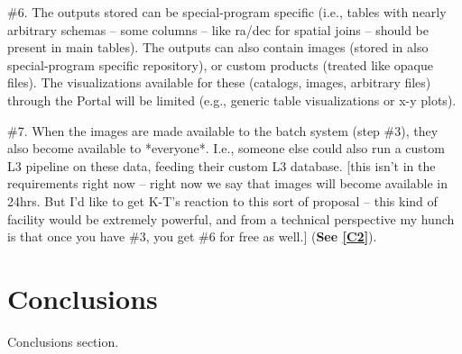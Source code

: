 \documentclass[DM,lsstdraft,toc]{lsstdoc}
\begin{document}
\#6. The outputs stored can be special-program specific (i.e., tables with nearly arbitrary schemas -- some columns -- like ra/dec for spatial joins -- should be present in main tables). The outputs can also contain images (stored in also special-program specific repository), or custom products (treated like opaque files). The visualizations available for these (catalogs, images, arbitrary files) through the Portal will be limited (e.g., generic table visualizations or x-y plots).

\#7. When the images are made available to the batch system (step \#3), they also become available to *everyone*. I.e., someone else could also run a custom L3 pipeline on these data, feeding their custom L3 database. [this isn't in the requirements right now -- right now we say that images will become available in 24hrs. But I'd like to get K-T's reaction to this sort of proposal -- this kind of facility would be extremely powerful, and from a technical perspective my hunch is that once you have \#3, you get \#6 for free as well.]
 (\textbf{See \ref{C2}}).


\section{Conclusions}\label{sec:conc}

Conclusions section.

%


\end{document}
